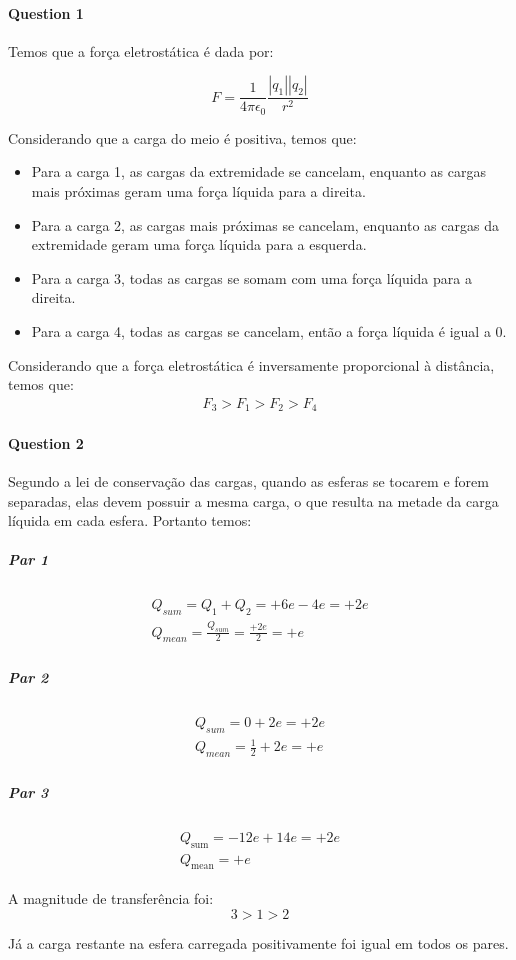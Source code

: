 
\paragraph{Question 1}

Temos que a força eletrostática é dada por:

\[
  F = \frac{1}{4 \pi \epsilon_0} \frac{|q_1| |q_2|}{r^2}
\]

Considerando que a carga do meio é positiva, temos que:

\begin{itemize}
  \item Para a carga 1, as cargas da extremidade se cancelam, enquanto as cargas mais próximas geram uma força líquida para a direita.
  \item Para a carga 2, as cargas mais próximas se cancelam, enquanto as cargas da extremidade geram uma força líquida para a esquerda.
  \item Para a carga 3, todas as cargas se somam com uma força líquida para a direita.
  \item Para a carga 4, todas as cargas se cancelam, então a força líquida é igual a 0.
\end{itemize}

Considerando que a força eletrostática é inversamente proporcional à distância, temos que:
\begin{gather*}
  F_3 > F_1 > F_2 > F_4
\end{gather*}

\paragraph{Question 2}
Segundo a lei de conservação das cargas, quando as esferas se tocarem e forem separadas, elas devem possuir a mesma carga, o que resulta na metade da carga líquida em cada esfera. Portanto temos:

\subparagraph{Par 1}
\begin{gather}
  \begin{align}
    Q_{sum} = Q_1 + Q_2 = +6e -4e = +2e \\
    Q_{mean} = \frac{Q_{sum}}{2} = \frac{+2e}{2} = +e
  \end{align}
\end{gather}

\subparagraph{Par 2}
\begin{gather}
  \begin{align}
    Q_{sum} = 0 +2e = +2e \\
    Q_{mean} = \frac{1}{2} +2e = +e 
  \end{align}
\end{gather}

\subparagraph{Par 3}
\begin{gather}
  \begin{align}
    Q_{\text{sum}} = -12e +14e = +2e \\
    Q_{\text{mean}} = +e
  \end{align}
\end{gather}

A magnitude de transferência foi:
\[
  3 > 1 > 2
\]

Já a carga restante na esfera carregada positivamente foi igual em todos os pares.
